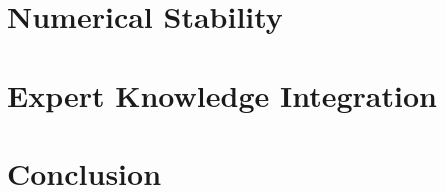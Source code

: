\documentclass[11pt,twoside,openright]{book}
\begin{document}
\chapter{Numerical Stability}
\label{ch:numerical-stability}


\chapter{Expert Knowledge Integration}
\label{ch:expert-knowledge}


\chapter{Conclusion}
\label{ch:conclusion}


\backmatter
\printbibliography[heading=bibintoc]
\end{document}
